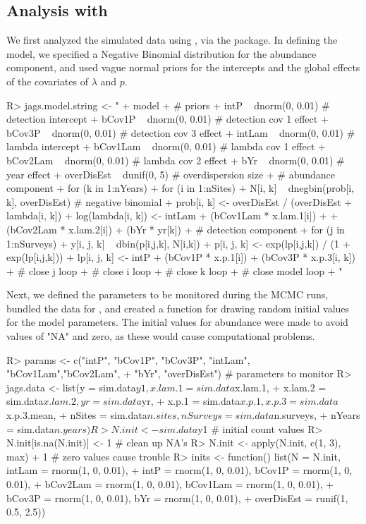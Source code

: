 \documentclass[article]{jss}
\begin{document}
\subsection[Analysis with JAGS]{Analysis with }
We first analyzed the simulated data using , via the  package. In defining the model, we specified a Negative Binomial distribution for the abundance component, and used vague normal priors for the intercepts and the global effects of the covariates of $\lambda$ and $p$.

\begin{CodeInput}
R> jags.model.string <- "
+    model {
+    # priors
+    intP ~ dnorm(0, 0.01)       # detection intercept
+    bCov1P ~ dnorm(0, 0.01)     # detection cov 1 effect
+    bCov3P ~ dnorm(0, 0.01)     # detection cov 3 effect
+    intLam ~ dnorm(0, 0.01)     # lambda intercept
+    bCov1Lam ~ dnorm(0, 0.01)   # lambda cov 1 effect
+    bCov2Lam ~ dnorm(0, 0.01)   # lambda cov 2 effect
+    bYr ~ dnorm(0, 0.01)        # year effect
+    overDisEst ~ dunif(0, 5)    # overdispersion size
+    # abundance component
+    for (k in 1:nYears){
+      for (i in 1:nSites){
+        N[i, k] ~ dnegbin(prob[i, k], overDisEst) # negative binomial
+        prob[i, k] <- overDisEst / (overDisEst + lambda[i, k])
+        log(lambda[i, k]) <- intLam + (bCov1Lam * x.lam.1[i]) + 
+                             (bCov2Lam * x.lam.2[i]) + (bYr * yr[k])
+    # detection component
+        for (j in 1:nSurveys){
+          y[i, j, k] ~ dbin(p[i,j,k], N[i,k])
+          p[i, j, k] <- exp(lp[i,j,k]) / (1 + exp(lp[i,j,k]))
+          lp[i, j, k] <- intP + (bCov1P * x.p.1[i]) + (bCov3P * x.p.3[i, k])
+        } # close j loop
+      } # close i loop
+    } # close k loop
+  } # close model loop
+  "
\end{CodeInput}

Next, we defined the parameters to be monitored during the MCMC runs, bundled the data for , and created a function for drawing random initial values for the model parameters. The initial values for abundance were made to avoid values of "NA" and zero, as these would cause computational problems.

\begin{CodeInput}
R> params <- c("intP", "bCov1P", "bCov3P", "intLam", "bCov1Lam","bCov2Lam",
+              "bYr", "overDisEst") # parameters to monitor
R> jags.data <- list(y = sim.data$y1, x.lam.1 = sim.data$x.lam.1,
+               x.lam.2 = sim.data$x.lam.2, yr = sim.data$yr,
+               x.p.1 = sim.data$x.p.1, x.p.3 = sim.data$x.p.3.mean,
+               nSites = sim.data$n.sites, nSurveys = sim.data$n.surveys,
+               nYears = sim.data$n.years)
R> N.init <- sim.data$y1 # initial count values
R> N.init[is.na(N.init)] <- 1 # clean up NA's
R> N.init <- apply(N.init, c(1, 3), max) + 1 # zero values cause trouble
R> inits <- function() list(N = N.init, intLam = rnorm(1, 0, 0.01),
+               intP = rnorm(1, 0, 0.01), bCov1P = rnorm(1, 0, 0.01),
+               bCov2Lam = rnorm(1, 0, 0.01), bCov1Lam = rnorm(1, 0, 0.01),
+               bCov3P = rnorm(1, 0, 0.01), bYr = rnorm(1, 0, 0.01),
+               overDisEst = runif(1, 0.5, 2.5))
\end{CodeInput}
\end{document}
